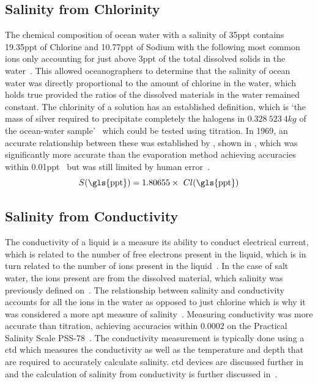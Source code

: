 \subsection{Salinity from Chlorinity}\label{subsec:salinity-from-chlorinity}

The chemical composition of ocean water with a salinity of 35\gls{ppt} contains 19.35\gls{ppt} of Chlorine and 10.77\gls{ppt} of Sodium with the following most common ions only accounting for just above 3\gls{ppt} of the total dissolved solids in the water~\cite{britannica_seawater_encyclopaedia_2024}.
This allowed oceanographers to determine that the salinity of ocean water was directly proportional to the amount of chlorine in the water, which holds true provided the ratios of the dissolved materials in the water remained constant.
The chlorinity of a solution has an established definition, which is `the mass of silver required to precipitate completely the halogens in $0.328\ 523\ 4 kg$ of the ocean-water sample'~\cite{wooster_redefinition_of_salinity_1969} which could be tested using titration.
In 1969, an accurate relationship between these was established by , shown in , which was significantly more accurate than the evaporation method achieving accuracies within 0.01\gls{ppt}~\cite{sverdrup_ocean_physics_and_chemistry_1942} but was still limited by human error~\cite{lewis_salinity_definition_and_calculation_1978}.
\begin{equation}\label{eqn:salinity-chlorinity}
 S (\text{\gls{ppt}}) = 1.80655 \times~Cl (\text{\gls{ppt}})
\end{equation}

\subsection{Salinity from Conductivity}\label{subsec:salinity-from-conductivity}

The conductivity of a liquid is a measure its ability to conduct electrical current, which is related to the number of free electrons present in the liquid, which is in turn related to the number of ions present in the liquid~\cite{stewart_introduction_to_physical_oceanography_2004}.
In the case of salt water, the ions present are from the dissolved material, which salinity was previously defined on~\cite{stewart_introduction_to_physical_oceanography_2004}.
The relationship between salinity and conductivity accounts for all the ions in the water as opposed to just chlorine which is why it was considered a more apt measure of salinity~\cite{lewis_salinity_definition_and_calculation_1978}.
Measuring conductivity was more accurate than titration, achieving accuracies within $0.0002$ on the Practical Salinity Scale PSS-78~\cite{seabird_salinity_accuracy}.
The conductivity measurement is typically done using a \gls{ctd} which measures the conductivity as well as the temperature and depth that are required to accurately calculate salinity.
\Gls{ctd} devices are discussed further in  and the calculation of salinity from conductivity is further discussed in~.

